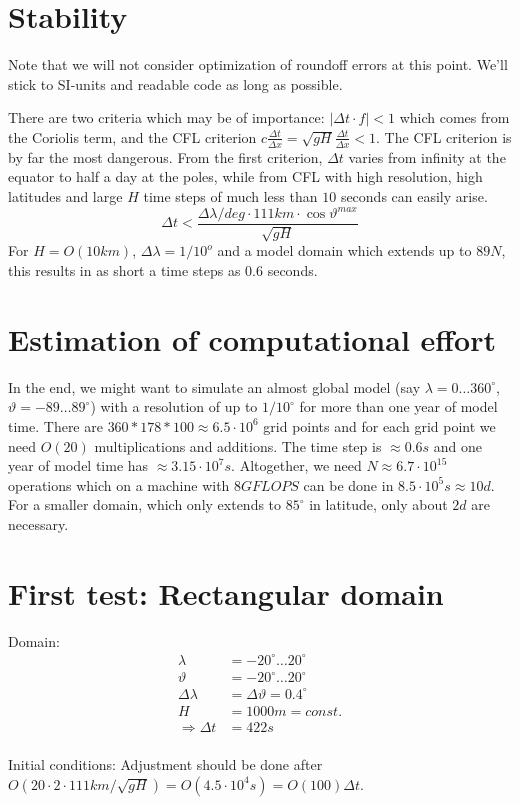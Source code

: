 \documentclass[a4paper]{article}
\begin{document}

\section{Stability}
Note that we will not consider optimization of roundoff errors at this point. We'll stick
to SI-units and readable code as long as possible.

There are two criteria which may be of importance: $|\Delta t\cdot f|<1$ which comes from the
Coriolis term, and the CFL criterion $c\frac{\Delta t}{\Delta x}=\sqrt{gH}\frac{\Delta t}{\Delta x}<1$. The CFL
criterion is by far the most dangerous. From the first criterion, $\Delta t$ varies from infinity
at the equator to half a day at the poles, while from CFL with high resolution, high latitudes and 
large $H$ time steps of much less than $10$ seconds can easily arise.
\begin{equation}
  \Delta t < \frac{\Delta\lambda/deg \cdot 111km \cdot \cos\vartheta^{max}}{\sqrt{gH}} 
\end{equation}
For $H=O(10km)$, $\Delta\lambda=1/10^{o}$ and a model domain which extends up to $89N$, this results in 
as short a time steps as $0.6$ seconds.


\section{Estimation of computational effort}
In the end, we might want to simulate an almost global model
(say $\lambda=0\ldots360^\circ$, $\vartheta=-89\ldots89^\circ$) with a resolution 
of up to $1/10^\circ$ for more than one year of model time. There are 
$360*178*100\approx 6.5\cdot10^6$ grid points and for each grid point we need $O(20)$ 
multiplications and additions. The time step is $\approx 0.6s$ and one year of model time
has $\approx 3.15\cdot 10^7s$. Altogether, we need $N\approx 6.7\cdot 10^{15}$ operations which
on a machine with $8GFLOPS$ can be done in $8.5\cdot 10^5s\approx 10d$. For a smaller domain, which
only extends to $85^\circ$ in latitude, only about $2d$ are necessary.


\section{First test: Rectangular domain}
Domain:
\begin{equation}
  \begin{split}
    \lambda & = -20^\circ \ldots 20^\circ \\
    \vartheta & = -20^\circ \ldots 20^\circ \\
    \Delta \lambda & = \Delta \vartheta = 0.4^\circ \\
    H & = 1000m = const. \\
    \Rightarrow \Delta t & = 422 s \\
  \end{split}
\end{equation}

Initial conditions:
Adjustment should be done after $O(20 \cdot 2 \cdot 111km / \sqrt{gH}) = 
O(4.5\cdot 10^4s) = O(100) \Delta t$.


%
%
\end{document}
